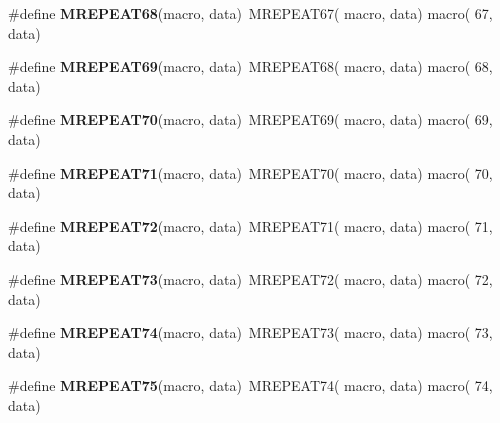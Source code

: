 \begin{DoxyCompactItemize}
\item 
\hypertarget{group__group__sam0__utils__mrepeat_ga1f925f41c5c5e044e274c24fd24f3416}{}\#define {\bfseries M\+R\+E\+P\+E\+A\+T68}(macro,  data)~M\+R\+E\+P\+E\+A\+T67( macro, data)   macro( 67, data)\label{group__group__sam0__utils__mrepeat_ga1f925f41c5c5e044e274c24fd24f3416}

\item 
\hypertarget{group__group__sam0__utils__mrepeat_gaf5b5c7b140c272560551ca6b6b37256c}{}\#define {\bfseries M\+R\+E\+P\+E\+A\+T69}(macro,  data)~M\+R\+E\+P\+E\+A\+T68( macro, data)   macro( 68, data)\label{group__group__sam0__utils__mrepeat_gaf5b5c7b140c272560551ca6b6b37256c}

\item 
\hypertarget{group__group__sam0__utils__mrepeat_ga677da95097e98df0ab8d600dc490e39a}{}\#define {\bfseries M\+R\+E\+P\+E\+A\+T70}(macro,  data)~M\+R\+E\+P\+E\+A\+T69( macro, data)   macro( 69, data)\label{group__group__sam0__utils__mrepeat_ga677da95097e98df0ab8d600dc490e39a}

\item 
\hypertarget{group__group__sam0__utils__mrepeat_ga702fd0113374ea1ce97cbc50be2332f9}{}\#define {\bfseries M\+R\+E\+P\+E\+A\+T71}(macro,  data)~M\+R\+E\+P\+E\+A\+T70( macro, data)   macro( 70, data)\label{group__group__sam0__utils__mrepeat_ga702fd0113374ea1ce97cbc50be2332f9}

\item 
\hypertarget{group__group__sam0__utils__mrepeat_gab6f74943a635c95e80aaf53e744212fd}{}\#define {\bfseries M\+R\+E\+P\+E\+A\+T72}(macro,  data)~M\+R\+E\+P\+E\+A\+T71( macro, data)   macro( 71, data)\label{group__group__sam0__utils__mrepeat_gab6f74943a635c95e80aaf53e744212fd}

\item 
\hypertarget{group__group__sam0__utils__mrepeat_gac9174dbacb9c007ef48316a965f67118}{}\#define {\bfseries M\+R\+E\+P\+E\+A\+T73}(macro,  data)~M\+R\+E\+P\+E\+A\+T72( macro, data)   macro( 72, data)\label{group__group__sam0__utils__mrepeat_gac9174dbacb9c007ef48316a965f67118}

\item 
\hypertarget{group__group__sam0__utils__mrepeat_ga87d76594b00b293cc7221f7de33e1a41}{}\#define {\bfseries M\+R\+E\+P\+E\+A\+T74}(macro,  data)~M\+R\+E\+P\+E\+A\+T73( macro, data)   macro( 73, data)\label{group__group__sam0__utils__mrepeat_ga87d76594b00b293cc7221f7de33e1a41}

\item 
\hypertarget{group__group__sam0__utils__mrepeat_ga0b35f78c7db7ec7d73d5af309eb1c59c}{}\#define {\bfseries M\+R\+E\+P\+E\+A\+T75}(macro,  data)~M\+R\+E\+P\+E\+A\+T74( macro, data)   macro( 74, data)\label{group__group__sam0__utils__mrepeat_ga0b35f78c7db7ec7d73d5af309eb1c59c}


\end{DoxyCompactItemize}
